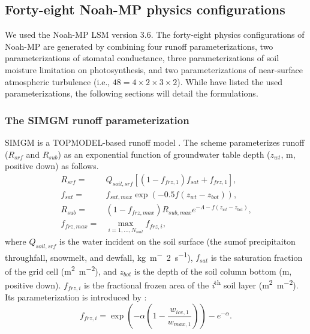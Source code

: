 \documentclass[essd]{copernicus}
\begin{document}
\subsection{Forty-eight Noah-MP physics configurations} \label{sec:data:noahmp}

We used the Noah-MP LSM version 3.6. The forty-eight physics configurations of
Noah-MP are generated by combining four runoff parameterizations, two
parameterizations of stomatal conductance, three parameterizations of soil
moisture limitation on photosynthesis, and two parameterizations of near-surface
atmospheric turbulence (i.e., \(48 = 4 \times 2 \times 3 \times 2\)). While
\citet[Table 1]{zheng2019WRR} have listed the used parameterizations, the
following sections will detail the formulations.

\subsubsection{The SIMGM runoff parameterization}

SIMGM is a TOPMODEL-based runoff model \citep{niu2007JGRA}. The scheme
parameterizes runoff (\(R_{srf}\) and \(R_{sub}\)) as an exponential function of
groundwater table depth (\(z_{wt}\), m, positive down) as follows.
\begin{align}
  R_{srf} =     & Q_{soil,srf} [(1 - f_{frz,1}) f_{sat} + f_{frz,1} ]
  \text{,} \label{eq:SIMGM:rsrf} \\
  f_{sat} =     & f_{sat,max} \exp(-0.5 f (z_{wt} - z_{bot}))
  \text{,} \label{eq:SIMGM:fsat} \\
  R_{sub} =     & (1 - f_{frz,max}) R_{sub,max} e^{-\Lambda - f(z_{wt} - z_{bot})}
  \text{,} \label{eq:SIMGM:rsub} \\
  f_{frz,max} = & \max_{i=1,\dots,N_{soil}} f_{frz,i}
  \text{,} \label{eq:SIMGM:ffrzmax}
\end{align}
where \(Q_{soil,srf}\) is the water incident on the soil surface (the sumof
precipitaiton throughfall, snowmelt, and dewfall, \si{kg~m^-2~s^{-1}}),
\(f_{sat}\) is the saturation fraction of the grid cell (\si{m^2~m^{-2}}), and
\(z_{bot}\) is the depth of the soil column bottom (\si{m}, positive down).
\(f_{frz,i}\) is the fractional frozen area of the
\textit{i}\textsuperscript{th} soil layer (\si{m^2~m^{-2}}). Its
parameterization is introduced by \citet{niu2006JH}:
\begin{equation}
  f_{frz,i} = \exp\left(-\alpha(1 - \frac{w_{ice,1}}{w_{max,1}})\right) -
  e^{-\alpha} \text{.}
\end{equation}
\end{document}
